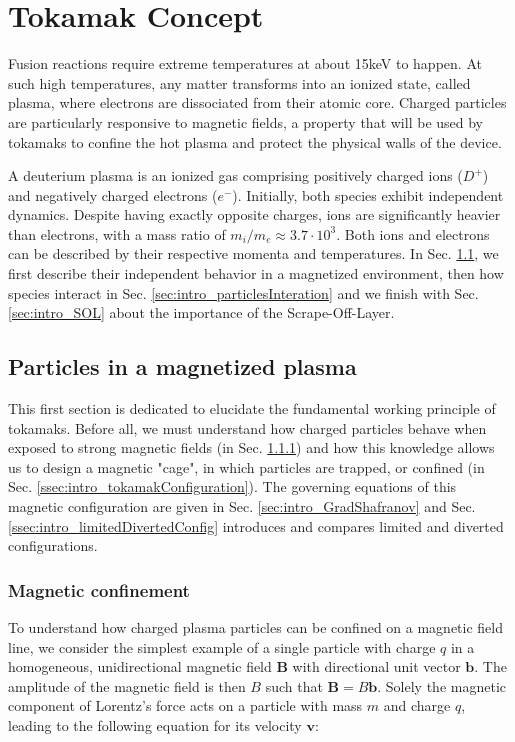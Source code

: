 \chapter{Tokamak Concept}
\label{chap:TokamakConcept}
Fusion reactions require extreme temperatures at about 15keV to happen. At such high temperatures, any matter transforms into an ionized state, called plasma, where electrons are dissociated from their atomic core. Charged particles are particularly responsive to magnetic fields, a property that will be used by tokamaks to confine the hot plasma and protect the physical walls of the device. 

A deuterium plasma is an ionized gas comprising positively charged ions ($D^+$) and negatively charged electrons ($e^-$). Initially, both species exhibit independent dynamics. Despite having exactly opposite charges, ions are significantly heavier than electrons, with a mass ratio of $m_i/m_e \approx 3.7\cdot 10^3$. Both ions and electrons can be described by their respective momenta and temperatures. In Sec. \ref{sec:intro_particlesInPlasma}, we first describe their independent behavior in a magnetized environment, then how species interact in Sec. \ref{sec:intro_particlesInteration} and we finish with Sec. \ref{sec:intro_SOL} about the importance of the Scrape-Off-Layer.


\section{Particles in a magnetized plasma}
\label{sec:intro_particlesInPlasma}
This first section is dedicated to elucidate the fundamental working principle of tokamaks. Before all, we must understand how charged particles behave when exposed to strong magnetic fields (in Sec. \ref{ssec:intro_magneticConfinement}) and how this knowledge allows us to design a magnetic "cage", in which particles are trapped, or confined (in Sec. \ref{ssec:intro_tokamakConfiguration}). The governing equations of this magnetic configuration are given in Sec. \ref{sec:intro_GradShafranov} and Sec. \ref{ssec:intro_limitedDivertedConfig} introduces and compares limited and diverted configurations.

\subsection{Magnetic confinement}
\label{ssec:intro_magneticConfinement}
To understand how charged plasma particles can be confined on a magnetic field line, we consider the simplest example of a single particle with charge \( q \) in a homogeneous, unidirectional magnetic field \(\textbf{B}\) with directional unit vector \(\textbf{b}\). The amplitude of the magnetic field is then $B$ such that $\mathbf{B} = B\mathbf{b}$. Solely the magnetic component of Lorentz's force acts on a particle with mass \( m \) and charge \( q \), leading to the following equation for its velocity \(\textbf{v}\):

